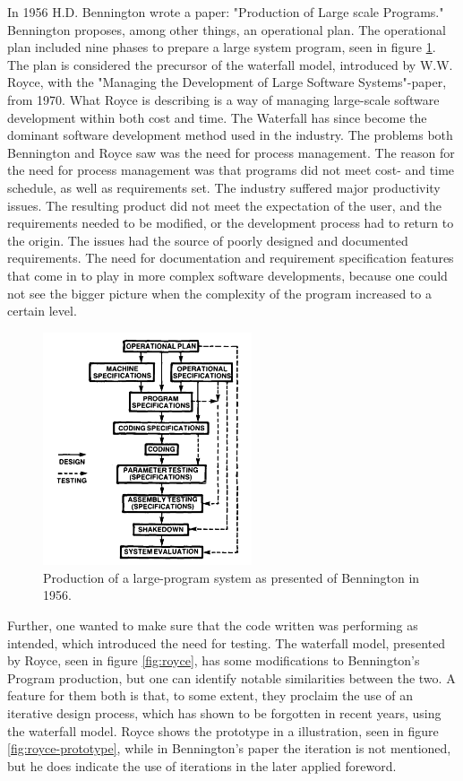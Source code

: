 In 1956 H.D. Bennington wrote a paper: "Production of Large scale Programs." Bennington proposes, among other things, an operational plan. The operational plan included nine phases to prepare a large system program, seen in figure \ref{fig:bennington}. The plan is considered the precursor of the waterfall model, introduced by W.W. Royce, with the "Managing the Development of Large Software Systems"-paper, from 1970. What Royce is describing is a way of managing large-scale software development within both cost and time. The Waterfall has since become the dominant software development method used in the industry. The problems both Bennington and Royce saw was the need for process management. The reason for the need for process management was that programs did not meet cost- and time schedule, as well as requirements set. The industry suffered major productivity issues. The resulting product did not meet the expectation of the user, and the requirements needed to be modified, or the development process had to return to the origin. The issues had the source of poorly designed and documented requirements. The need for documentation and requirement specification features that come in to play in more complex software developments, because one could not see the bigger picture when the complexity of the program increased to a certain level.

\begin{figure}
    \centering
    \includegraphics[width=0.55\textwidth]{fig/bennington-production-of-large-scale-programs.png}
    \caption{Production of a large-program system as presented of Bennington in 1956.}
    \label{fig:bennington}
\end{figure}

Further, one wanted to make sure that the code written was performing as intended, which introduced the need for testing. The waterfall model, presented by Royce, seen in figure \ref{fig:royce}, has some modifications to Bennington's Program production, but one can identify notable similarities between the two. A feature for them both is that, to some extent, they proclaim the use of an iterative design process, which has shown to be forgotten in recent years, using the waterfall model. Royce shows the prototype in a illustration, seen in figure \ref{fig:royce-prototype}, while in Bennington's paper the iteration is not mentioned, but he does indicate the use of iterations in the later applied foreword.

